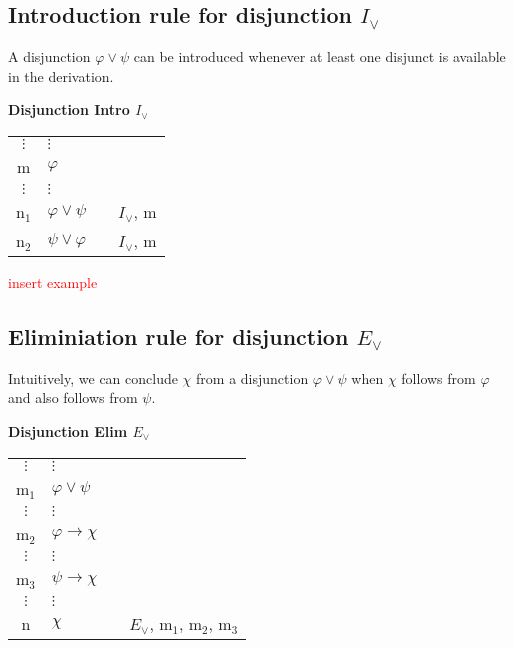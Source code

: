 \documentclass[nobib,nofonts]{tufte-handout}
\begin{document}
\subsection{Introduction rule for disjunction $I_{\vee}$}

A disjunction $\varphi \vee \psi$ can be introduced whenever at least one disjunct is available in the derivation.

\bigskip
\noindent \colorbox{mygray!60}{\centering
  \begin{minipage}[t]{0.35\linewidth}
    \textbf{Disjunction Intro $I_{\vee}$}
  \end{minipage}
  \begin{minipage}[t]{0.55\linewidth}
    \begin{tabular}{clcl}
      $\vdots$ & $\vdots$                   & \\
      m & $\varphi$  &  \\
      $\vdots$ & $\vdots$                   & \\
      n$_{1}$ & $\varphi \vee \psi$ & & $I_{\vee}$, m \\
      n$_{2}$ & $\psi \vee \varphi$ & & $I_{\vee}$, m
    \end{tabular}
  \end{minipage}
}
\bigskip

\textcolor{red}{insert example}

\subsection{Eliminiation rule for disjunction $E_{\vee}$}

Intuitively, we can conclude $\chi$ from a disjunction $\varphi \vee \psi$ when $\chi$ follows from $\varphi$ and also follows from $\psi$.

\bigskip
\noindent \colorbox{mygray!60}{\centering
  \begin{minipage}[t]{0.35\linewidth}
    \textbf{Disjunction Elim $E_{\vee}$}
  \end{minipage}
  \begin{minipage}[t]{0.55\linewidth}
    \begin{tabular}{clcl}
            $\vdots$ & $\vdots$                   & \\
      m$_{1}$        & $\varphi \vee \psi$        &  \\
            $\vdots$ & $\vdots$                   & \\
      m$_{2}$        & $\varphi \rightarrow \chi$ &  \\
            $\vdots$ & $\vdots$                   & \\
      m$_{3}$        & $\psi  \rightarrow \chi$   &  \\
            $\vdots$ & $\vdots$                   & \\
      n             & $\chi$                     & & $E_{\vee}$, m$_{1}$, m$_{2}$, m$_{3}$
    \end{tabular}
  \end{minipage}
}
\bigskip
\end{document}

